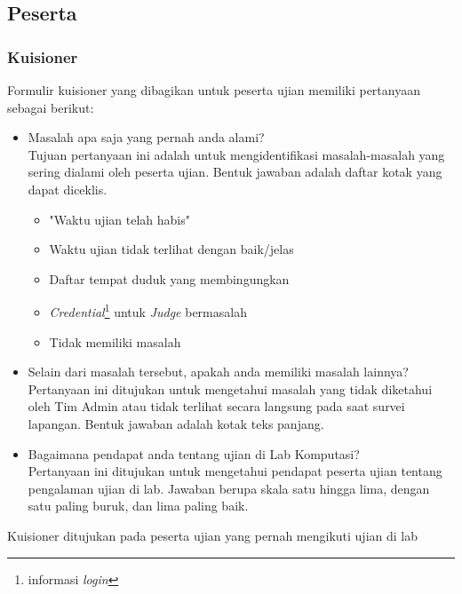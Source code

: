 \subsection{Peserta}
    \subsubsection{Kuisioner}
    Formulir kuisioner yang dibagikan untuk peserta ujian memiliki pertanyaan
    sebagai berikut:
    \begin{itemize}
        \item Masalah apa saja yang pernah anda alami?\\
            Tujuan pertanyaan ini adalah untuk mengidentifikasi masalah-masalah
            yang sering dialami oleh peserta ujian. Bentuk jawaban adalah daftar
            kotak yang dapat diceklis.
            \begin{itemize}
                \item "Waktu ujian telah habis"
                \item Waktu ujian tidak terlihat dengan baik/jelas
                \item Daftar tempat duduk yang membingungkan
                \item \textit{Credential}\footnote{informasi \textit{login}}
                untuk \textit{Judge} bermasalah
                \item Tidak memiliki masalah
            \end{itemize}
            
        \item Selain dari masalah tersebut, apakah anda memiliki masalah
        lainnya?\\
            Pertanyaan ini ditujukan untuk mengetahui masalah yang tidak
            diketahui oleh Tim Admin atau tidak terlihat secara langsung pada
            saat survei lapangan. Bentuk jawaban adalah kotak teks panjang.
            
        \item Bagaimana pendapat anda tentang ujian di Lab Komputasi?\\
            Pertanyaan ini ditujukan untuk mengetahui pendapat peserta ujian
            tentang pengalaman ujian di lab. Jawaban berupa skala satu hingga
            lima, dengan satu paling buruk, dan lima paling baik.
            
    \end{itemize}
    Kuisioner ditujukan pada peserta ujian yang pernah mengikuti ujian di lab
